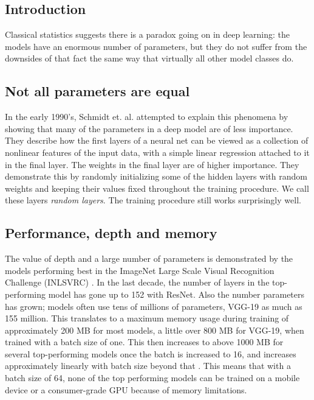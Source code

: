 \documentclass[]{article}
\begin{document}
\begin{multicols}{2}
	\section{Introduction}
	Classical statistics suggests there is a paradox going on in deep learning: the models have an enormous number of parameters, but they do not suffer from the downsides of that fact the same way that virtually all other model classes do.
	
	\subsection{Not all parameters are equal}
	In the early 1990's, Schmidt et. al. \cite{Schmidt_Kraaijveld_Duin} attempted to explain this phenomena by showing that many of the parameters in a deep model are of less importance. They describe how the first layers of a neural net can be viewed as a collection of nonlinear features of the input data, with a simple linear regression attached to it in the final layer. The weights in the final layer are of higher importance. They demonstrate this by randomly initializing some of the hidden layers with random weights and keeping their values fixed throughout the training procedure. We call these layers \emph{random layers}. The training procedure still works surprisingly well.
	
	\subsection{Performance, depth and memory}\label{performance_depth_memory}
	The value of depth and a large number of parameters is demonstrated by the models performing best in the ImageNet Large Scale Visual Recognition Challenge (INLSVRC) \cite{DBLP:journals/corr/CanzianiPC16}. In the last decade, the number of layers in the top-performing model has gone up to 152 with ResNet. Also the number parameters has grown; models often use tens of millions of parameters, VGG-19 as much as 155 million. This translates to a maximum memory usage during training of approximately 200 MB for most models, a little over 800 MB for VGG-19, when trained with a batch size of one. This then increases to above 1000 MB for several top-performing models once the batch is increased to 16, and increases approximately linearly with batch size beyond that \cite{DBLP:journals/corr/CanzianiPC16}. This means that with a batch size of 64, none of the top performing models can be trained on a mobile device or a consumer-grade GPU because of memory limitations.
	

\end{multicols}
\end{document}
